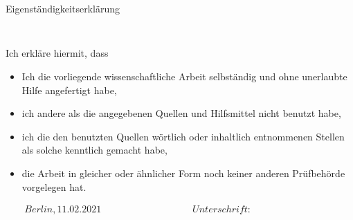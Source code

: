 \section*{}
\thispagestyle{empty}

\begin{verbatim}

\end{verbatim}

\begin{LARGE}Eigenständigkeitserklärung\end{LARGE}
\begin{verbatim}


\end{verbatim}

Ich erkläre hiermit, dass

\begin{itemize}
\item Ich die vorliegende wissenschaftliche Arbeit selbständig und ohne unerlaubte Hilfe angefertigt habe,
\item ich andere als die angegebenen Quellen und Hilfsmittel nicht benutzt habe,
\item ich die den benutzten Quellen wörtlich oder inhaltlich entnommenen Stellen als solche kenntlich gemacht 
habe, 
\item die Arbeit in gleicher oder ähnlicher Form noch keiner anderen Prüfbehörde vorgelegen hat.
\end{itemize}



\begin{displaymath}
\begin{array}{ll}
    Berlin, 11.02.2021~~~~~~~~~~~~~~~~~~~~~~~~~~~~~~~~~~~~~~~
    &
Unterschrift:~~~~~~~~~~~~~~~~~~~~~~~~~~~~~~~~~~~~~~~
\end{array}
\end{displaymath}